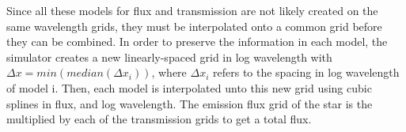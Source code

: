 \documentclass[12pt]{article}
\begin{document}
Since all these models for flux and transmission are not likely created on the same wavelength grids, they must be interpolated onto a common grid before they can be combined. In order to preserve the information in each model, the simulator creates a new linearly-spaced grid in log wavelength with $\Delta x = min(median(\Delta x_i))$, where $\Delta x_i$ refers to the spacing in log wavelength of model i. Then, each model is interpolated unto this new grid using cubic splines in flux, and log wavelength. The emission flux grid of the star is the multiplied by each of the transmission grids to get a total flux.


    
\pagebreak
\end{document}
